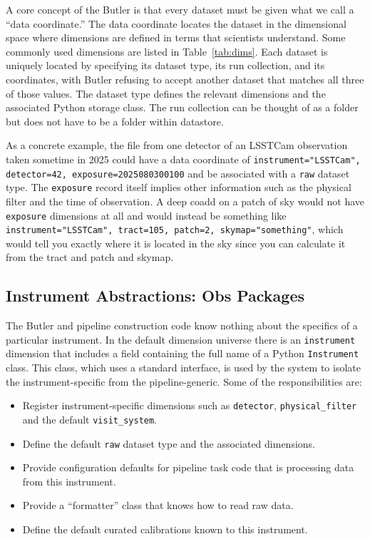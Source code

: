 A core concept of the Butler is that every dataset must be given what we call a ``data coordinate.''
The data coordinate locates the dataset in the dimensional space where dimensions are defined in terms that scientists understand.
Some commonly used dimensions are listed in Table~\ref{tab:dims}.
Each dataset is uniquely located by specifying its dataset type, its run collection, and its coordinates, with Butler refusing to accept another dataset that matches all three of those values.
The dataset type defines the relevant dimensions and the associated Python storage class.
The run collection can be thought of as a folder but does not have to be a folder within datastore.

As a concrete example, the file from one detector of an LSSTCam observation taken sometime in 2025 could have a data coordinate of \texttt{instrument="LSSTCam", detector=42, exposure=2025080300100} and be associated with a \texttt{raw} dataset type.
The \texttt{exposure} record itself implies other information such as the physical filter and the time of observation.
A deep coadd on a patch of sky would not have \texttt{exposure} dimensions at all and would instead be something like \texttt{instrument="LSSTCam", tract=105, patch=2, skymap="something"}, which would tell you exactly where it is located in the sky since you can calculate it from the tract and patch and skymap.

\subsection{Instrument Abstractions: Obs Packages}

The Butler and pipeline construction code know nothing about the specifics of a particular instrument.
In the default dimension universe there is an \texttt{instrument} dimension that includes a field containing the full name of a Python \texttt{Instrument} class.
This class, which uses a standard interface, is used by the system to isolate the instrument-specific from the pipeline-generic.
Some of the responsibilities are:

\begin{itemize}
\item Register instrument-specific dimensions such as \texttt{detector}, \texttt{physical\_filter} and the default \texttt{visit\_system}.
\item Define the default \texttt{raw} dataset type and the associated dimensions.
\item Provide configuration defaults for pipeline task code that is processing data from this instrument.
\item Provide a ``formatter'' class that knows how to read raw data.
\item Define the default curated calibrations known to this instrument.
\end{itemize}

